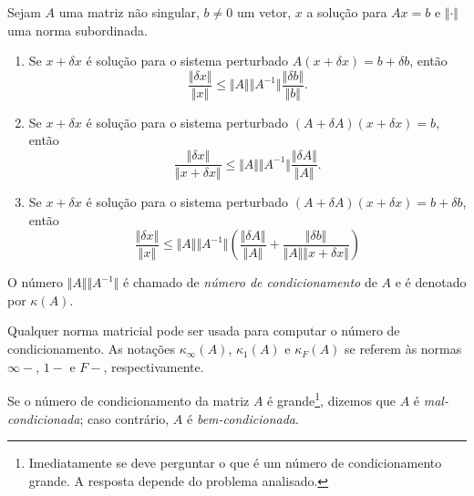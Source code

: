\documentclass{article}
\begin{document}
\begin{thm}
    Sejam \(A\) uma matriz não singular, \(b \neq 0\) um vetor, \(x\) a solução para \(Ax=b\) e \(\Vert \cdot \Vert\) uma norma subordinada.
    \begin{enumerate}
        \item Se \(x+\delta x\) é solução para o sistema perturbado \(A(x+\delta x)=b+\delta b\), então
            \begin{equation}
                \frac{\Vert \delta x \Vert}{\Vert x \Vert} \leq \Vert A \Vert \Vert A^{-1} \Vert \frac{\Vert \delta b \Vert}{\Vert b \Vert}.
            \end{equation}
        \item Se \(x+\delta x\) é solução para o sistema perturbado \((A+\delta A)(x+\delta x)=b\), então
            \begin{equation}
                \frac{\Vert \delta x \Vert}{\Vert x+\delta x \Vert} \leq \Vert A \Vert \Vert A^{-1} \Vert \frac{\Vert \delta A \Vert}{\Vert A \Vert}.
            \end{equation}
        \item Se \(x+\delta x\) é solução para o sistema perturbado \((A+\delta A)(x+\delta x)=b+\delta b\), então
            \begin{equation}
                \frac{\Vert \delta x \Vert}{\Vert x \Vert} \leq \Vert A \Vert \Vert A^{-1} \Vert \left( \frac{\Vert \delta A \Vert}{\Vert A \Vert} + \frac{\Vert \delta b \Vert}{\Vert A \Vert \Vert x+\delta x \Vert} \right)
            \end{equation}
    \end{enumerate}
\end{thm}

\begin{defn}
    O número \(\Vert A \Vert \Vert A^{-1} \Vert\) é chamado de \emph{número de condicionamento} de \(A\) e é denotado por \(\kappa(A)\).
\end{defn}

\begin{rem}
    Qualquer norma matricial pode ser usada para computar o número de condicionamento. As notações \(\kappa_\infty(A)\), \(\kappa_1(A)\) e \(\kappa_F(A)\) se referem às normas \(\infty-\), \(1-\) e \(F-\), respectivamente.
\end{rem}

\begin{defn}
    Se o número de condicionamento da matriz \(A\) é grande\footnote{Imediatamente se deve perguntar o que é um número de condicionamento grande. A resposta depende do problema analisado.}, dizemos que \(A\) é \emph{mal-condicionada}; caso contrário, \(A\) é \emph{bem-condicionada}.
\end{defn}
\end{document}
